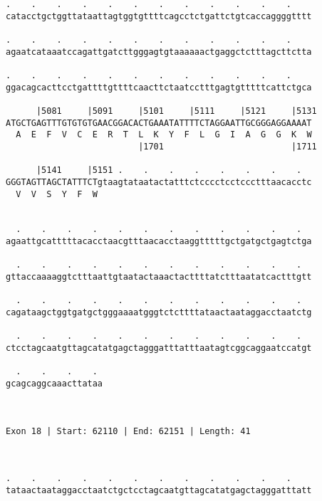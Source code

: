 \documentclass{article}
\begin{document}
\begin{Verbatim}
.    .    .    .    .    .    .    .    .    .    .    .    
catacctgctggttataattagtggtgttttcagcctctgattctgtcaccaggggtttt
                                                            
.    .    .    .    .    .    .    .    .    .    .    .    
agaatcataaatccagattgatcttgggagtgtaaaaaactgaggctctttagcttctta
                                                            
.    .    .    .    .    .    .    .    .    .    .    .    
ggacagcacttcctgattttgttttcaacttctaatcctttgagtgtttttcattctgca
                                                            
      |5081     |5091     |5101     |5111     |5121     |5131
ATGCTGAGTTTGTGTGTGAACGGACACTGAAATATTTTCTAGGAATTGCGGGAGGAAAAT
  A  E  F  V  C  E  R  T  L  K  Y  F  L  G  I  A  G  G  K  W
                          |1701                         |1711
  
      |5141     |5151 .    .    .    .    .    .    .    .  
GGGTAGTTAGCTATTTCTgtaagtataatactatttctcccctcctccctttaacacctc
  V  V  S  Y  F  W                                          
                                                            
  
  .    .    .    .    .    .    .    .    .    .    .    .  
agaattgcatttttacacctaacgtttaacacctaaggtttttgctgatgctgagtctga
                                                            
  .    .    .    .    .    .    .    .    .    .    .    .  
gttaccaaaaggtctttaattgtaatactaaactacttttatctttaatatcactttgtt
                                                            
  .    .    .    .    .    .    .    .    .    .    .    .  
cagataagctggtgatgctgggaaaatgggtctcttttataactaataggacctaatctg
                                                            
  .    .    .    .    .    .    .    .    .    .    .    .  
ctcctagcaatgttagcatatgagctagggatttatttaatagtcggcaggaatccatgt
                                                            
  .    .    .    . 
gcagcaggcaaacttataa
                   
                   
 
Exon 18 | Start: 62110 | End: 62151 | Length: 41



.    .    .    .    .    .    .    .    .    .    .    .    
tataactaataggacctaatctgctcctagcaatgttagcatatgagctagggatttatt
                                                            

\end{Verbatim}
\end{document}
